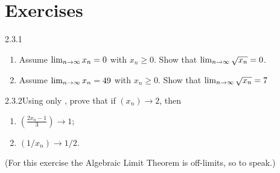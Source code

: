 \section*{Exercises}

\begin{exercise}
    {2.3.1}
    \begin{enumerate}
        \item Assume \(\lim_{n \rightarrow \infty}x_n = 0\) with \(x_n \geq 0\). Show that \(\lim_{n \rightarrow \infty}\sqrt{x_n} = 0\).
        \item Assume \(\lim_{n \rightarrow \infty}x_n = 49\) with \(x_n \geq 0\). Show that \(\lim_{n \rightarrow \infty}\sqrt{x_n} = 7\)
    \end{enumerate}
\end{exercise}


\begin{exercise}
    {2.3.2}Using only , prove that if \((x_n) \rightarrow 2\), then
    \begin{enumerate}
        \item \(\displaystyle \left(\frac{2x_n - 1}{3}\right) \rightarrow 1\);
        \item \(\displaystyle \left(1 / x_n\right) \rightarrow 1 / 2\).
    \end{enumerate}
    (For this exercise the Algebraic Limit Theorem is off-limits, so to speak.)
\end{exercise}

